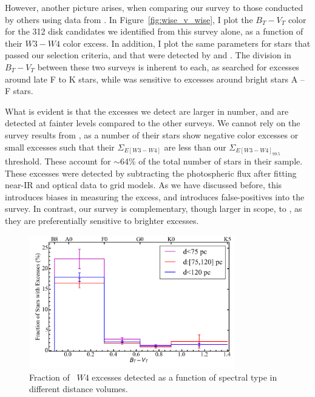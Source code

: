     However, another picture arises, when comparing our survey to those conducted by others using data from \WS. In Figure~\ref{fig:wise_v_wise}, I plot the $B_T-V_T$ color for the 312 disk candidates we identified from this survey alone, as a function of their $W3-W4$ color excess. In addition, I plot the same parameters for stars that passed our selection criteria, and that were detected by \citet{Vican2014} and \citet{Wu2013}. The division in $B_T-V_T$ between these two surveys is inherent to each, as \citet{Vican2014} searched for excesses around late F to K stars, while \citet{Wu2013} was sensitive to excesses around bright stars A -- F stars. 
    
    What is evident is that the excesses we detect are larger in number, and are detected at fainter levels compared to the other surveys. We cannot rely on the survey results from \citet{Vican2014}, as a number of their stars show negative color excesses or small excesses such that their $\Sigma_{E[W3-W4]}$ are less than our $\Sigma_{E[W3-W4]_{99.5}}$ threshold. These account for $\sim$64\% of the total number of stars in their sample. These excesses were detected by subtracting the photospheric flux after fitting near-IR and optical data to grid models. As we have discussed before, this introduces biases in measuring the excess, and introduces false-positives into the survey. In contrast, our survey is complementary, though larger in scope, to \citet{Wu2013}, as they are preferentially sensitive to brighter excesses. 

    \begin{figure}
    \centering
    \includegraphics[width=0.8\textwidth]{Ch5/incidencerates_120pc}
    \caption[Incidence of Excesses]{Fraction of \WS\ $W4$ excesses detected as a function of spectral type in different distance volumes.}
    \label{fig:incidence_rates}
    \end{figure}
 
